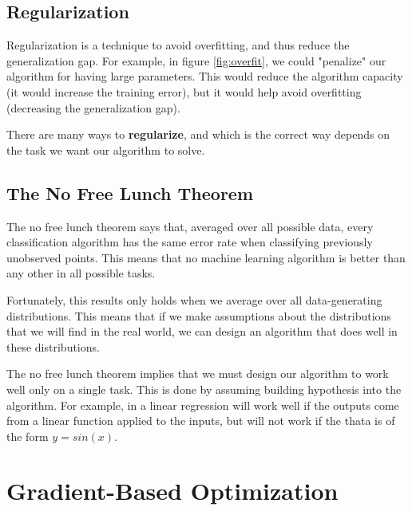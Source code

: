 \subsection{Regularization}

Regularization is a technique to avoid overfitting, and thus reduce the generalization gap. For example, in figure \ref{fig:overfit}, we could "penalize" our algorithm for having large parameters. This would reduce the algorithm capacity (it would increase the training error), but it would help avoid overfitting (decreasing the generalization gap).

There are many ways to \textbf{regularize}, and which is the correct way depends on the task we want our algorithm to solve.

\subsection{The No Free Lunch Theorem}

The no free lunch theorem \parencite{no-free-lunch} says that, averaged over all possible data, every classification algorithm has the same error rate when classifying previously unobserved points. This means that no machine learning algorithm is better than any other in all possible tasks. 

Fortunately, this results only holds when we average over all data-generating distributions. This means that if we make assumptions about the distributions that we will find in the real world, we can design an algorithm that does well in these distributions.

The no free lunch theorem implies that we must design our algorithm to work well only on a single task. This is done by assuming building hypothesis into the algorithm. For example, in a linear regression will work well if the outputs come from a linear function applied to the inputs, but will not work if the thata is of the form \(y=sin(x)\).


\section{Gradient-Based Optimization}

